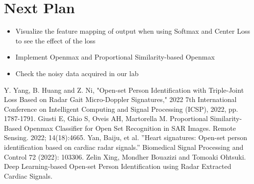 \documentclass[dvipdfmx]{article}
\begin{document}
\section{Next Plan}
\begin{itemize}
    \item Visualize the feature mapping of output when using Softmax and Center Loss to see the effect of the loss
    \item Implement Openmax and Proportional Similarity-based Openmax
    \item Check the noisy data acquired in our lab
\end{itemize}
\begin{thebibliography}{99}

 Y. Yang, B. Huang and Z. Ni, "Open-set Person Identification with Triple-Joint Loss Based on Radar Gait Micro-Doppler Signatures," 2022 7th International Conference on Intelligent Computing and Signal Processing (ICSP), 2022, pp. 1787-1791.
 Giusti E, Ghio S, Oveis AH, Martorella M. Proportional Similarity-Based Openmax Classifier for Open Set Recognition in SAR Images. Remote Sensing. 2022; 14(18):4665.
 Yan, Baiju, et al. ”Heart signatures: Open-set person identification based on cardiac radar signals.” Biomedical Signal Processing and Control 72 (2022): 103306.
 Zelin Xing, Mondher Bouazizi and Tomoaki Ohtsuki. Deep Learning-based Open-set Person Identification using Radar Extracted Cardiac Signals. 
\end{thebibliography}
\end{document}
